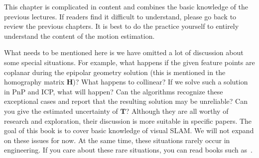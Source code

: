 This chapter is complicated in content and combines the basic knowledge of the previous lectures. If readers find it difficult to understand, please go back to review the previous chapters. It is best to do the practice yourself to entirely understand the content of the motion estimation.

What needs to be mentioned here is we have omitted a lot of discussion about some special situations. For example, what happens if the given feature points are coplanar during the epipolar geometry solution (this is mentioned in the homography matrix $\mathbf{H}$)? What happens to collinear? If we solve such a solution in PnP and ICP, what will happen? Can the algorithms recognize these exceptional cases and report that the resulting solution may be unreliable? Can you give the estimated uncertainty of $\mathbf{T}$? Although they are all worthy of research and exploration, their discussion is more suitable in specific papers. The goal of this book is to cover basic knowledge of visual SLAM. We will not expand on these issues for now. At the same time, these situations rarely occur in engineering. If you care about these rare situations, you can read books such as~\cite{Hartley2003}.

